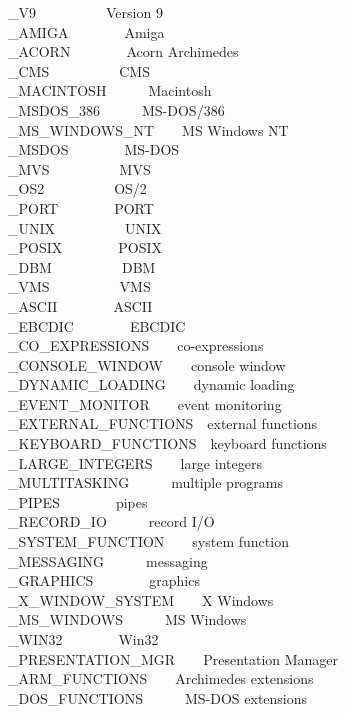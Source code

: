 \_V9\ \ \ \ \ \ \ \ \ \ Version 9\\
\_AMIGA\ \ \ \ \ \ \ \ Amiga\\
\_ACORN\ \ \ \ \ \ \ \ Acorn Archimedes\\
\_CMS\ \ \ \ \ \ \ \ \ \ CMS\\
\_MACINTOSH\ \ \ \ \ \ Macintosh\\
\_MSDOS\_386\ \ \ \ \ \ MS-DOS/386\\
\_MS\_WINDOWS\_NT\ \ \ \ MS Windows NT\\
\_MSDOS\ \ \ \ \ \ \ \ MS-DOS\\
\_MVS\ \ \ \ \ \ \ \ \ \ MVS\\
\_OS2\ \ \ \ \ \ \ \ \ \ OS/2\\
\_PORT\ \ \ \ \ \ \ \ PORT\\
\_UNIX\ \ \ \ \ \ \ \ \ \ UNIX\\
\_POSIX\ \ \ \ \ \ \ \ POSIX\\
\_DBM\ \ \ \ \ \ \ \ \ \ DBM\\
\_VMS\ \ \ \ \ \ \ \ \ \ VMS\\
\_ASCII\ \ \ \ \ \ \ \ ASCII\\
\_EBCDIC\ \ \ \ \ \ \ \ EBCDIC\\
\_CO\_EXPRESSIONS\ \ \ \ co-expressions\\
\_CONSOLE\_WINDOW\ \ \ \ console window\\
\_DYNAMIC\_LOADING\ \ \ \ dynamic loading\\
\_EVENT\_MONITOR\ \ \ \ event monitoring\\
\_EXTERNAL\_FUNCTIONS\ \ external functions\\
\_KEYBOARD\_FUNCTIONS\ \ keyboard functions\\
\_LARGE\_INTEGERS\ \ \ \ large integers\\
\_MULTITASKING\ \ \ \ \ \ multiple programs\\
\_PIPES\ \ \ \ \ \ \ \ pipes\\
\_RECORD\_IO\ \ \ \ \ \ record I/O\\
\_SYSTEM\_FUNCTION\ \ \ \ system function\\
\_MESSAGING\ \ \ \ \ \ messaging\\
\_GRAPHICS\ \ \ \ \ \ \ \ graphics\\
\_X\_WINDOW\_SYSTEM\ \ \ \ X Windows\\
\_MS\_WINDOWS\ \ \ \ \ \ MS Windows\\
\_WIN32\ \ \ \ \ \ \ \ Win32\\
\_PRESENTATION\_MGR\ \ \ \ Presentation Manager\\
\_ARM\_FUNCTIONS\ \ \ \ Archimedes extensions\\
\_DOS\_FUNCTIONS\ \ \ \ \ \ MS-DOS extensions

